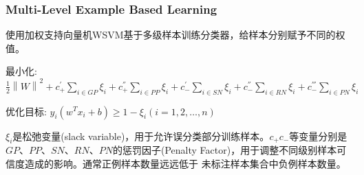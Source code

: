 \subsubsection{Multi-Level Example Based Learning}

使用加权支持向量机WSVM基于多级样本训练分类器，给样本分别赋予不同的权值。

最小化: $\frac{1}{2}\left \| W \right \| ^2 + 
        c_{+}^{'}\sum_{i \in GP}\xi_i +
        c_{+}^{''}\sum_{i \in PP}\xi_i +
        c_{-}^{'}\sum_{i \in SN}\xi_i +
        c_{-}^{''}\sum_{i \in RN}\xi_i +
        c_{-}^{'''}\sum_{i \in PN}\xi_i 
        $

优化目标: $y_i(w^Tx_i + b) \geq 1 - \xi_i (i = 1,2, \ldots, n)$

$\xi_i$是松弛变量(slack variable)，用于允许误分类部分训练样本。$c_{+}$$c_{-}$等变量分别是$GP$、$PP$、$SN$、$RN$、$PN$的惩罚因子(Penalty Factor)，用于调整不同级别样本可信度造成的影响。通常正例样本数量远远低于 未标注样本集合中负例样本数量。


